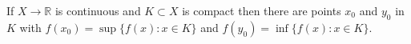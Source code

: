 If $X \to \mathbb{R}$ is continuous and $K \subset X$ is compact then there are points $x_0$ and $y_0$ in $K$ with $f(x_0) = \sup \{f(x): x \in K\}$ and $f(y_0) = \inf \{f(x): x \in K\}$.
